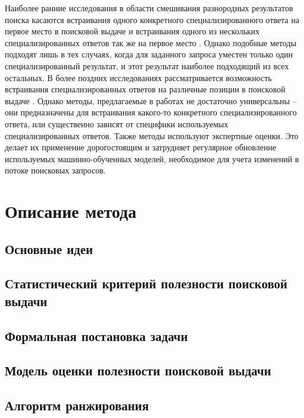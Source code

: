 \documentclass[12pt,a4paper]{report}
\begin{document}
Наиболее ранние исследования в области смешивания разнородных результатов поиска касаются встраивания одного конкретного специализированного ответа на первое место в поисковой выдаче \cite{Diaz-News, Konig, Li} и встраивания одного из нескольких специализированных ответов так же на первое место \cite{Arguello-VerticalSelection2009, Arguello-VerticalSelection2010, DiazArguello-VerticalSelection}. Однако подобные методы подходят лишь в тех случаях, когда для заданного запроса уместен только один специализированный результат, и этот результат наиболее подходящий из всех остальных. В более поздних исследованиях рассматривается возможность встраивания специализированных ответов на различные позиции в поисковой выдаче \cite{Lefortier-YandexVideo, Ponnuswami, Arguello-CIKM11, Jie-YahooFederationSystem}. 
Однако методы, предлагаемые в работах \cite{Lefortier-YandexVideo, Ponnuswami, Arguello-CIKM11} не достаточно универсальны -- они предназначены для встраивания какого-то конкретного специализированного ответа, или существенно зависят от специфики используемых специализированных ответов.
Также методы \cite{Ponnuswami, Arguello-CIKM11} используют экспертные оценки. Это делает их применение дорогостоящим и затрудняет регулярное обновление используемых машинно-обученных моделей, необходимое для учета изменений в потоке поисковых запросов.


\chapter{Описание метода}

\section{Основные идеи}
\section{Статистический критерий полезности поисковой выдачи}
\section{Формальная постановка задачи}
\section{Модель оценки полезности поисковой выдачи}
\section{Алгоритм ранжирования}
\end{document}
